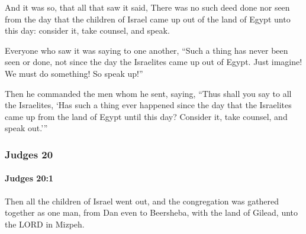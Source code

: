 			\begin{versebox}
					\item[BHS] 
					\item[ASV] And it was so, that all that saw it said, There was no such deed done nor seen from the day that the children of Israel came up out of the land of Egypt unto this day: consider it, take counsel, and speak.
					\item[NIV] Everyone who saw it was saying to one another, “Such a thing has never been seen or done, not since the day the Israelites came up out of Egypt. Just imagine! We must do something! So speak up!”
					\item[NRSV] Then he commanded the men whom he sent, saying, “Thus shall you say to all the Israelites, ‘Has such a thing ever happened since the day that the Israelites came up from the land of Egypt until this day? Consider it, take counsel, and speak out.’”
			\end{versebox}
	\subsubsection{Judges 20} %
		\label{JUDGES-20}

		\paragraph{Judges 20:1} %
			\label{JUDGES-20-1}

			Then all the children of Israel went out, and the congregation was gathered together as one man, from Dan even to Beersheba, with the land of Gilead, unto the LORD in Mizpeh.

